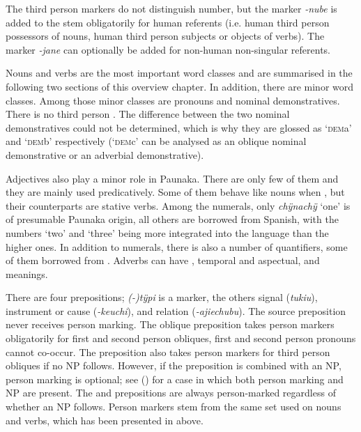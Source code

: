 The third person markers do not distinguish number, but the  marker \textit{-nube} is added to the stem obligatorily for human referents (i.e. human third person possessors of nouns, human third person subjects or objects of verbs). The  marker \textit{-jane} can optionally be added for non-human non-singular referents.

Nouns and verbs are the most important word classes and are summarised in the following two sections of this overview chapter. In addition, there are minor word classes. Among those minor classes are pronouns and nominal demonstratives. There is no third person . The difference between the two nominal demonstratives could not be determined, which is why they are glossed as ‘\textsc{dem}a’ and ‘\textsc{dem}b’ respectively (‘\textsc{dem}c’ can be analysed as an oblique nominal demonstrative or an adverbial demonstrative).

Adjectives also play a minor role in Paunaka. There are only few of them and they are mainly used predicatively. Some of them behave like nouns when , but their  counterparts are stative verbs. Among the numerals, only \textit{chÿnachÿ} ‘one’ is of presumable Paunaka origin, all others are borrowed from Spanish, with the numbers ‘two’ and ‘three’ being more integrated into the language than the higher ones. In addition to numerals, there is also a number of quantifiers, some of them borrowed from . Adverbs can have , temporal and aspectual, and  meanings.

There are four prepositions; \textit{(-)tÿpi} is a  marker, the others signal  (\textit{tukiu}), instrument or cause  (\textit{-keuchi}), and  relation (\textit{-ajie\-chu\-bu}). The source preposition never receives person marking. The oblique preposition takes person markers obligatorily for first and second person obliques, first and second person pronouns cannot co-occur. The preposition also takes person markers for third person obliques if no NP follows. However, if the preposition is combined with an NP, person marking is optional; see () for a case in which both person marking and NP are present. The  and  prepositions are always person-marked regardless of whether an NP follows. Person markers stem from the same set used on nouns and verbs, which has been presented in  above.

